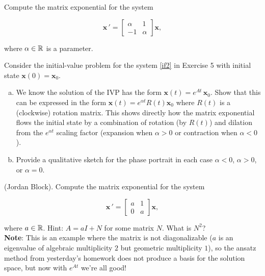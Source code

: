 \documentclass[11pt,letterpaper,boxed]{pset}
\begin{document}
    
    \begin{problem} [Exercise 5.]
        Compute the matrix exponential for the system
        
        \begin{equation}
            \mathbf{x} \, ' = \begin{bmatrix} \alpha & 1 \\ -1 & \alpha \end{bmatrix} \mathbf{x},\label{if2}
        \end{equation}
         
        where $\alpha \in \mathbb{R}$ is a parameter.
    \end{problem}
    \newpage
    
    
    \begin{problem} [Exercise 6.]
        Consider the initial-value problem for the system \eqref{if2} in Exercise 5 with initial state $\mathbf{x}(0)=\mathbf{x}_0$.
        
        \begin{enumerate} [(a)]
            \item We know the solution of the IVP has the form $\mathbf{x}(t) =e^{At} \, \mathbf{x}_0$. Show that this can be expressed in the form $\mathbf{x}(t) = e^{\alpha t} R(t) \mathbf{x}_0$ where $R(t)$ is a (clockwise) rotation matrix. This shows directly how the matrix exponential flows the initial state by a combination of rotation (by $R(t)$) and dilation from the $e^{\alpha t}$ scaling factor (expansion when $\alpha > 0$ or contraction when $\alpha < 0$).
            \item Provide a qualitative sketch for the phase portrait in each case  $\alpha < 0$, $\alpha > 0$, or $\alpha = 0$.  
        \end{enumerate}
    \end{problem}
    \newpage
    
    \begin{problem} [Exercise 7.]
        (Jordan Block). Compute the matrix exponential for the system
        
        \begin{equation}
            \mathbf{x} \, ' = \begin{bmatrix} a & 1 \\ 0 & a \end{bmatrix} \mathbf{x},\label{if}
        \end{equation}
        
        where $a \in \mathbb{R}$. Hint: $A=aI + N$ for some matrix $N$. What is $N^2$? \\
        
        \textbf{Note}: This is an example where the matrix is not diagonalizable ($a$ is an eigenvalue of algebraic multiplicity $2$ but geometric multiplicity $1$), so the ansatz method from yesterday's homework does not produce a basis for the solution space, but now with $e^{At}$ we're all good! 
    \end{problem}
    \newpage
    
\end{document}
